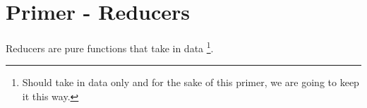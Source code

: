 \maketitle{}
\section{ Primer - Reducers }
Reducers are pure functions that take in data \footnote{Should take in data only
and for the sake of this primer, we are going to keep it this way.}. 
